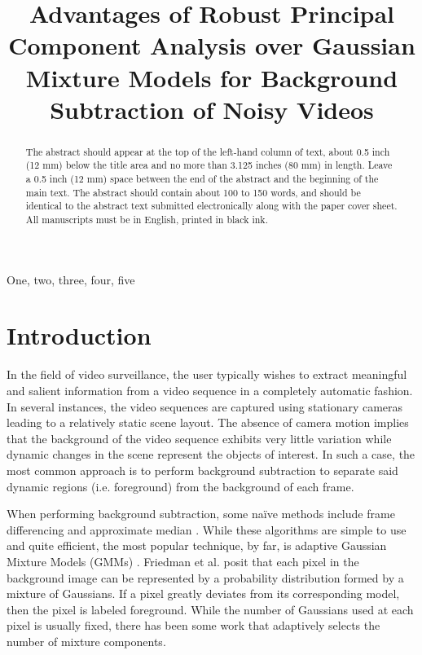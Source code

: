 \documentclass{article}
\title{Advantages of Robust Principal Component Analysis over Gaussian Mixture Models for Background Subtraction of Noisy Videos}
\begin{document}
%
\maketitle
%
\begin{abstract}
The abstract should appear at the top of the left-hand column of text, about
0.5 inch (12 mm) below the title area and no more than 3.125 inches (80 mm) in
length.  Leave a 0.5 inch (12 mm) space between the end of the abstract and the
beginning of the main text.  The abstract should contain about 100 to 150
words, and should be identical to the abstract text submitted electronically
along with the paper cover sheet.  All manuscripts must be in English, printed
in black ink.
\end{abstract}
%
\begin{keywords}
One, two, three, four, five
\end{keywords}
%


\section{Introduction}
In the field of video surveillance, the user typically wishes to extract meaningful and salient information from a video sequence in a completely automatic fashion. In several instances, the video sequences are captured using stationary cameras leading to a relatively static scene layout. The absence of camera motion implies that the background of the video sequence exhibits very little variation while dynamic changes in the scene represent the objects of interest. In such a case, the most common approach is to perform background subtraction to separate said dynamic regions (i.e. foreground) from the background of each frame.

When performing background subtraction, some na\"ive methods include frame differencing and approximate median \cite{approxMed}. %
While these algorithms are simple to use and quite efficient, the most popular technique, by far, is adaptive  Gaussian Mixture Models (GMMs) \cite{FriedmanGMM}. Friedman et al. posit that each pixel in the background image can be represented by a probability distribution formed by a mixture of Gaussians. If a pixel greatly deviates from its corresponding model, then the pixel is labeled foreground. While the number of Gaussians used at each pixel is usually fixed, there has been some work \cite{ZivGMM} that adaptively selects the number of mixture components.
\end{document}
